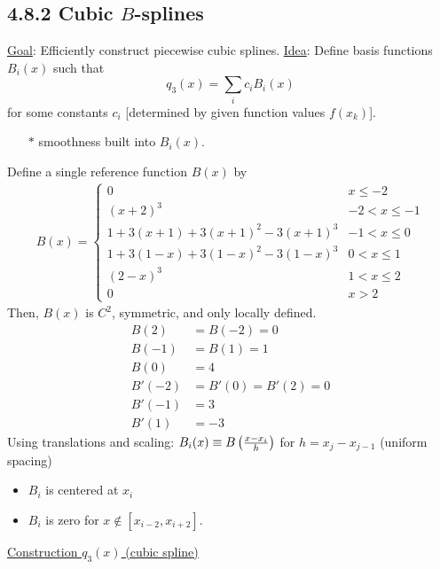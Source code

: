 \documentclass[]{article}
\begin{document}
\subsection*{4.8.2 Cubic $B$-splines}

\ul{Goal}: Efficiently construct piecewise cubic splines.
\ul{Idea}: Define basis functions $B_i(x)$ such that $$q_3(x) = \sum_i c_iB_i(x)$$ for some constants $c_i$ [determined by given function values $f(x_k)$].
\begin{enumerate}
	\item[$*$] smoothness built into $B_i(x)$.
\end{enumerate}
Define a single reference function $B(x)$ by
\begin{align*}
	B(x) =
	\begin{cases}
		0 & x\leq -2 \\
		(x+2)^3 & -2<x\leq-1 \\
		1+3(x+1)+3(x+1)^2-3(x+1)^3 & -1<x\leq0 \\
		1+3(1-x)+3(1-x)^2-3(1-x)^3 & 0<x\leq1 \\
		(2-x)^3 & 1<x\leq 2 \\
		0 & x > 2
	\end{cases}
\end{align*}
Then, $B(x)$ is $C^2$, symmetric, and only locally defined.
\begin{align*}
	B(2) &= B(-2) = 0 \\
	B(-1) &= B(1) = 1 \\
	B(0) &= 4 \\
	B'(-2) &= B'(0) = B'(2) = 0 \\
	B'(-1) &= 3 \\
	B'(1) &= -3
\end{align*}
Using translations and scaling:
$B_i(x) \equiv B\left(\frac{x-x_i}h\right)$ for $h=x_j-x_{j-1}$ (uniform spacing)
\begin{itemize}
	\item $B_i$ is centered at $x_i$
	\item $B_i$ is zero for $x\notin[x_{i-2},x_{i+2}]$.
\end{itemize}

\ul{Construction $q_3(x)$ (cubic spline)}
\end{document}
